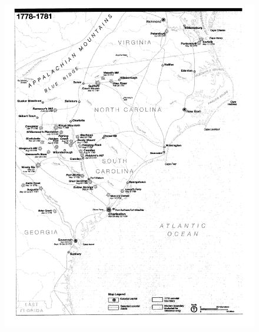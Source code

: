 \begin{figure}[h]
	\singlespacing
	\begin{center}
	  \includegraphics[width=6in]{gfx/rauch_battle_2007_01_p18}
	\end{center}
	\caption{\cite[18]{rauch_battle_2007}}
	\label{cowppark97}
\end{figure}

